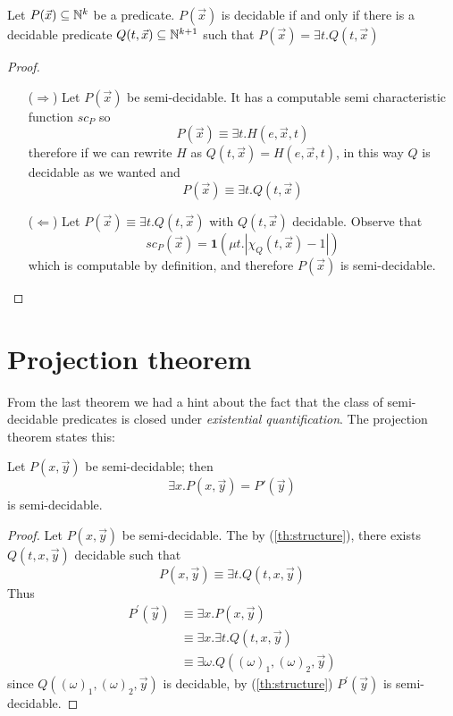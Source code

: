 \begin{theorem}\label{th:structure}
  Let $P(\vec{x}) \subseteq \mathbb{N}^k$ be a predicate.
  $ P(\vec{x})$ is decidable if and only if there is a decidable predicate $
  Q(t,\vec{x}) \subseteq \mathbb{N}^{k+1} $ such that $ P(\vec{x}) = \exists
  t. Q(t,\vec{x}) $
  \begin{proof}
    \begin{itemize}
    \item[($\Rightarrow$)] Let $P(\vec{x})$ be
      semi-decidable. It has a computable semi characteristic function
      $sc_P$ so
      \[
        P(\vec{x}) \equiv \exists t . H(e,\vec{x}, t)
      \]
      therefore if we can rewrite $H$ as
      $Q(t, \vec{x}) = H(e,\vec{x}, t)$, in this way $Q$ is decidable as
      we wanted and \[P(\vec{x}) \equiv \exists t . Q(t, \vec{x})\]

    \item[($\Leftarrow$)] Let
      \(P(\vec{x}) \equiv \exists t . Q(t, \vec{x})\) with $Q(t, \vec{x})$
      decidable. Observe that
      \[
        sc_P(\vec{x}) = \mathbf{1}(\mu t . |\chi_Q(t,\vec{x}) - 1|)
      \]
      which is computable by definition, and therefore $P(\vec{x})$ is
      semi-decidable.
    \end{itemize}
  \end{proof}
\end{theorem}

\section {Projection theorem}

From the last theorem we had a hint about the fact that the class of
semi-decidable predicates is closed under \emph{existential
  quantification}. The projection theorem states this:
\begin{theorem}
  Let $P(x,\vec{y})$ be semi-decidable; then
  \[
    \exists x.P(x,\vec{y}) = P'(\vec{y})
  \]
  is semi-decidable.

  \begin{proof}
    Let $P(x,\vec{y})$ be semi-decidable. The by
    (\ref{th:structure}), there exists $Q(t,x,\vec{y})$ decidable such that
    \[
      P(x, \vec{y}) \equiv \exists t . Q(t,x,\vec{y})
    \]
    Thus 
    \begin{align*}
      P^\prime(\vec{y}) &\equiv \exists x . P(x, \vec{y}) \\
        &\equiv \exists x .\exists t .
        Q(t,x,\vec{y}) \\
        &\equiv \exists \omega . Q((\omega)_1, (\omega)_2, \vec{y})
    \end{align*}    
    since $Q((\omega)_1, (\omega)_2, \vec{y})$ is decidable,
    by (\ref{th:structure}) $P^\prime(\vec{y})$ is
    semi-decidable.
  \end{proof}
\end{theorem}

